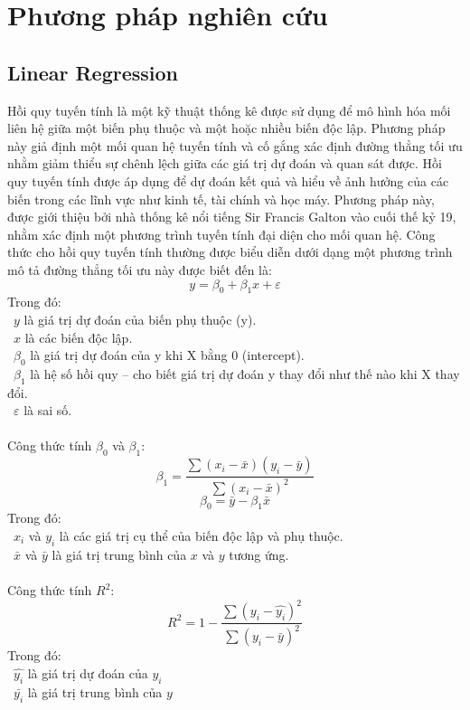 \section{Phương pháp nghiên cứu}
\subsection{Linear Regression}
Hồi quy tuyến tính là một kỹ thuật thống kê được sử dụng để mô hình hóa mối liên hệ giữa một biến phụ thuộc và một hoặc nhiều biến độc lập. Phương pháp này giả định một mối quan hệ tuyến tính và cố gắng xác định đường thẳng tối ưu nhằm giảm thiểu sự chênh lệch giữa các giá trị dự đoán và quan sát được. Hồi quy tuyến tính được áp dụng để dự đoán kết quả và hiểu về ảnh hưởng của các biến trong các lĩnh vực như kinh tế, tài chính và học máy. Phương pháp này, được giới thiệu bởi nhà thống kê nổi tiếng Sir Francis Galton vào cuối thế kỷ 19, nhằm xác định một phương trình tuyến tính đại diện cho mối quan hệ. Công thức cho hồi quy tuyến tính thường được biểu diễn dưới dạng một phương trình mô tả đường thẳng tối ưu này được biết đến là:
\[y=\beta_0+\beta_1x+\varepsilon\]
Trong đó:\\
	\indent\textbullet\ \(y\) là giá trị dự đoán của biến phụ thuộc (y).\\
	\indent\textbullet\ \(x\) là các biến độc lập.\\
	\indent\textbullet\ \(\beta_0\) là giá trị dự đoán của y khi X bằng 0 (intercept).\\
	\indent\textbullet\ \(\beta_1\) là hệ số hồi quy – cho biết giá trị dự đoán y thay đổi như thế nào khi X thay đổi.\\
	\indent\textbullet\ \(\varepsilon\) là sai số.\\
\\
Công thức tính \(\beta_0\) và \(\beta_1\):\\
\[\beta_1=\frac{\sum\left(x_i-\bar{x}\right)\left(y_i-\bar{y}\right)}{\sum\left(x_i-\bar{x}\right)^2}\]
\[\beta_0=\bar{y}-\beta_1\bar{x}\]
Trong đó:\\
	\indent\textbullet\ \(x_i\) và \(y_i\) là các giá trị cụ thể của biến độc lập và phụ thuộc.\\
	\indent\textbullet\ \(\bar{x}\) và \(\bar{y}\) là giá trị trung bình của \(x\) và \(y\) tương ứng.\\
\\
Công thức tính \(R^2\):
\[R^2=1-\frac{\sum\left(y_i-\hat{y_i}\right)^2}{\sum\left(y_i-\bar{y}\right)^2}\]
Trong đó:\\
	\indent\textbullet\ \(\hat{y_i}\) là giá trị dự đoán của \(y_i\)\\
	\indent\textbullet\ \(\bar{y_i}\) là giá trị trung bình của \(y\)\\

